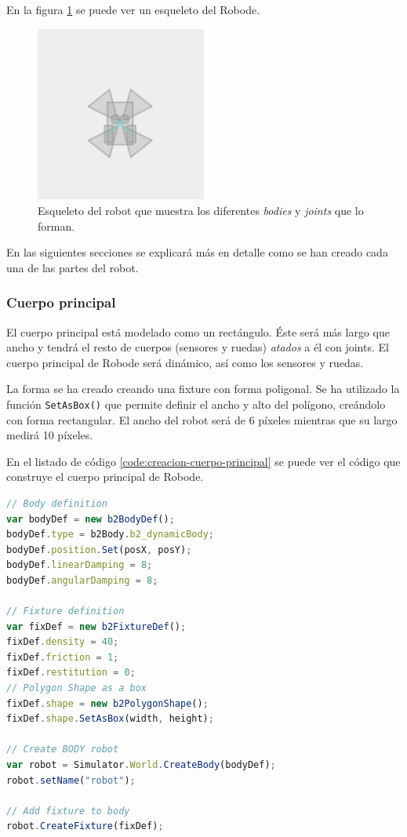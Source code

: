 En la figura \ref{fig:robot-skel} se puede ver un esqueleto del Robode.

\begin{figure}[!ht]
	\begin{centering}
		\includegraphics[width=0.5\textwidth]{images/robot-skel.png}
			\caption{Esqueleto del robot que muestra los diferentes \emph{bodies} y \emph{joints} que lo forman.}
				\label{fig:robot-skel}
	\end{centering}
\end{figure}

En las siguientes secciones se explicará más en detalle como se han creado cada una de las partes del robot.
 
\subsubsection*{Cuerpo principal}
\label{sec:cuerpo-principal}

El cuerpo principal está modelado como un rectángulo. Éste será más largo que ancho y tendrá el resto de cuerpos (sensores y ruedas) \emph{atados} a él con joints. El cuerpo principal de Robode será dinámico, así como los sensores y ruedas.

La forma se ha creado creando una fixture con forma poligonal. Se ha utilizado la función \texttt{SetAsBox()} que permite definir el ancho y alto del polígono, creándolo con forma rectangular. El ancho del robot será de 6 píxeles mientras que su largo medirá 10 píxeles.

En el listado de código \ref{code:creacion-cuerpo-principal} se puede ver el código que construye el cuerpo principal de Robode.

\begin{lstlisting}[language={Javascript},label={code:creacion-cuerpo-principal}, caption={Creación del cuerpo principal del robot utilizando la librería Box2dweb.}]
// Body definition
var bodyDef = new b2BodyDef(); 
bodyDef.type = b2Body.b2_dynamicBody;
bodyDef.position.Set(posX, posY);
bodyDef.linearDamping = 8;
bodyDef.angularDamping = 8;

// Fixture definition
var fixDef = new b2FixtureDef(); 
fixDef.density = 40;
fixDef.friction = 1;
fixDef.restitution = 0;
// Polygon Shape as a box
fixDef.shape = new b2PolygonShape(); 
fixDef.shape.SetAsBox(width, height);

// Create BODY robot
var robot = Simulator.World.CreateBody(bodyDef);
robot.setName("robot");

// Add fixture to body
robot.CreateFixture(fixDef);
\end{lstlisting}


